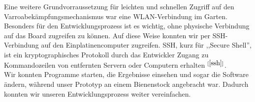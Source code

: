 \documentclass[11pt,a4paper]{article}
\newcommand{\bibRef}[1]{\hyperlink{#1}{$^{[\ref*{#1}{}]}$}}
\begin{document}
Eine weitere Grundvorraussetzung für leichten und schnellen Zugriff auf den Varroabekämpfungsmechanismus war eine WLAN-Verbindung im Garten. Besonders für den Entwicklungsprozess ist es wichtig, ohne physische Verbindung auf das Board zugreifen zu können. Auf diese Weise konnten wir per SSH-Verbindung auf den Einplatinencomputer zugreifen. SSH, kurz für ,,Secure Shell'', ist ein kryptographisches Protokoll durch das Entwickler Zugang zu Kommandozeilen von entfernten Servern oder Computern erhalten \bibRef{ssh}.\\
Wir konnten Programme starten, die Ergebnisse einsehen und sogar die Software ändern, während unser Prototyp an einem Bienenstock angebracht war. Dadurch konnten wir unseren Entwicklungsprozess weiter vereinfachen.
\end{document}
